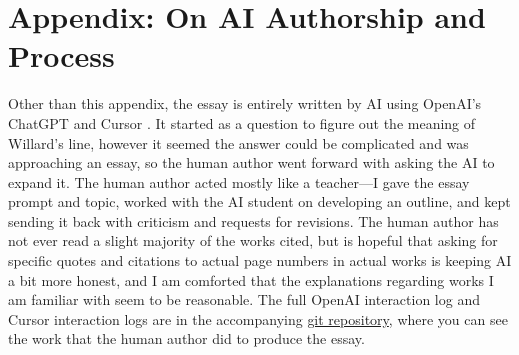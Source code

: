\section*{Appendix: On AI Authorship and Process}
\label{app:ai-authorship}

Other than this appendix, the essay is entirely written by AI using OpenAI's ChatGPT
\parencite{OpenAIChatGPT2024} and Cursor \parencite{CursorAI2024}. It started as a question
to figure out the meaning of Willard's line, however it seemed the answer could be complicated
and was approaching an essay, so the human author went forward with asking the AI to expand
it. The human author acted mostly like a teacher---I gave the essay prompt and topic, worked
with the AI student on developing an outline, and kept sending it back with criticism and
requests for revisions. The human author has not ever read a slight majority of the works
cited, but is hopeful that asking for specific quotes and citations to actual page numbers in
actual works is keeping AI a bit more honest, and I am comforted that the explanations
regarding works I am familiar with seem to be reasonable. The full OpenAI interaction log and
Cursor interaction logs are in the accompanying
\href{https://github.com/jmalicki/apocalypse-now-essay/tree/main/interaction-logs}{git
	repository}, where you can see the work that the human author did to produce the essay.
